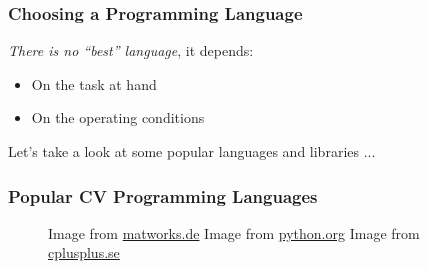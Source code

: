 \documentclass[xetex,professionalfont]{beamer}
\begin{document}
\begin{frame}
\frametitle{Choosing a Programming Language}

\emph{There is no \enquote{best} language}, it depends:
\begin{itemize}
	\item On the task at hand %
	\item On the operating conditions %
\end{itemize}

\bigskip
Let's take a look at some popular languages and libraries ...

\end{frame}


\begin{frame}
\frametitle{Popular CV Programming Languages}

\begin{figure}
\centering
{
	{\centering Image from \url{matworks.de}}}\quad
{
	{\centering Image from \url{python.org}}}\quad
{
	{\centering Image from \url{cplusplus.se}}}
\end{figure}

\end{frame}

\end{document}
